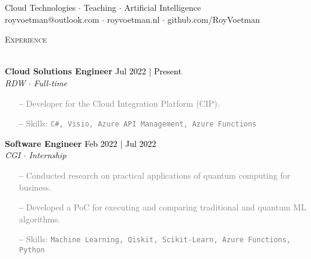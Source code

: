 \documentclass[a4paper]{article}
\newcommand{\lineunder} {
    \vspace*{-8pt} \\
    \hspace*{-18pt} \hrulefill \\
}
\newcommand{\header} [1] {
    {\hspace*{-18pt}\vspace*{6pt} \textsc{#1}}
    \vspace*{-6pt} \lineunder
}
\newcommand{\roundpic}[4][]{
  \tikz\node [circle, minimum width = #2,
    path picture = {
      \node [#1] at (path picture bounding box.center) {
        \texttt{[image: \#4]}};
    }] {};}
\begin{document}
\vspace*{-40pt}

    

\vspace*{-10pt}

\vspace{10mm}

\begin{center}
    \centering
    \raisebox{-0.5\height}{\roundpic{2.5cm}{2.5cm}{avatar1.jpeg}}
    \hspace*{.1in}
    
    \vspace*{10pt}
    {Cloud Technologies $\cdot$ Teaching $\cdot$ Artificial Intelligence}\\
    \vspace*{3pt}
	royvoetman@outlook.com $\cdot$ royvoetman.nl $\cdot$ github.com/RoyVoetman\\
\end{center}

\vspace{5mm}

\header{Experience}
\vspace{1mm}

\textbf{Cloud Solutions Engineer} \hfill \textcolor{black}{Jul 2022 | Present}\\
\textit{RDW $\cdot$ Full-time}\\
\vspace{-1mm}
\begin{itemize} \itemsep 1pt
    \item[--] \textcolor{gray}{Developer for the Cloud Integration Platform (CIP).}
    \item[--] \textcolor{gray}{Skills: \texttt{C\#, Visio, Azure API Management, Azure Functions}}
\end{itemize}

\textbf{Software Engineer} \hfill \textcolor{black}{Feb 2022 | Jul 2022}\\
\textit{CGI $\cdot$ Internship}\\
\vspace{-1mm}
\begin{itemize} \itemsep 1pt
    \item[--] \textcolor{gray}{Conducted research on practical applications of quantum computing for business.}
    \item[--] \textcolor{gray}{Developed a PoC for executing and comparing traditional and quantum ML algorithms.}
    \item[--] \textcolor{gray}{Skills: \texttt{Machine Learning, Qiskit, Scikit-Learn, Azure Functions, Python}}
\end{itemize}
\end{document}
